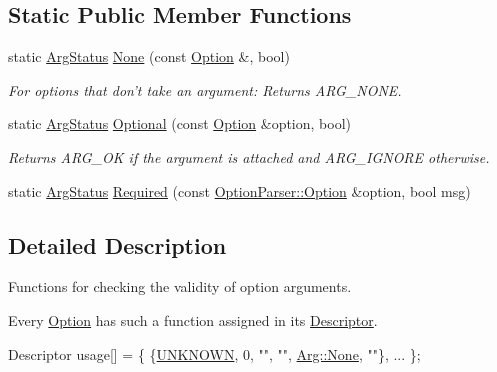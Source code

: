 \subsection*{Static Public Member Functions}
\begin{DoxyCompactItemize}
\item 
static \hyperlink{namespace_option_parser_ad237d47d58c66dea8dcf4f53ac11a6e4}{Arg\-Status} \hyperlink{struct_option_parser_1_1_arg_afd9e5e7362e4accc619fe7dee7098956}{None} (const \hyperlink{class_option_parser_1_1_option}{Option} \&, bool)
\begin{DoxyCompactList}\small\item\em For options that don't take an argument\-: Returns A\-R\-G\-\_\-\-N\-O\-N\-E. \end{DoxyCompactList}\item 
static \hyperlink{namespace_option_parser_ad237d47d58c66dea8dcf4f53ac11a6e4}{Arg\-Status} \hyperlink{struct_option_parser_1_1_arg_a3fcea82be66b4aff1971cbab6deabdf1}{Optional} (const \hyperlink{class_option_parser_1_1_option}{Option} \&option, bool)
\begin{DoxyCompactList}\small\item\em Returns A\-R\-G\-\_\-\-O\-K if the argument is attached and A\-R\-G\-\_\-\-I\-G\-N\-O\-R\-E otherwise. \end{DoxyCompactList}\item 
static \hyperlink{namespace_option_parser_ad237d47d58c66dea8dcf4f53ac11a6e4}{Arg\-Status} \hyperlink{struct_option_parser_1_1_arg_a499af2667b09f9f7f9fa9547dcd36e59}{Required} (const \hyperlink{class_option_parser_1_1_option}{Option\-Parser\-::\-Option} \&option, bool msg)
\end{DoxyCompactItemize}


\subsection{Detailed Description}
Functions for checking the validity of option arguments. 

Every \hyperlink{class_option_parser_1_1_option}{Option} has such a function assigned in its \hyperlink{struct_option_parser_1_1_descriptor}{Descriptor}. 
\begin{DoxyCode}
Descriptor usage[] = \{ \{\hyperlink{_community_detection-_x_8cpp_a0ba79095c558cb72ea2e8b277be1da39a6ce26a62afab55d7606ad4e92428b30c}{UNKNOWN}, 0, \textcolor{stringliteral}{""}, \textcolor{stringliteral}{""}, \hyperlink{struct_option_parser_1_1_arg_afd9e5e7362e4accc619fe7dee7098956}{Arg::None}, \textcolor{stringliteral}{""}\}, ... \};
\end{DoxyCode}


